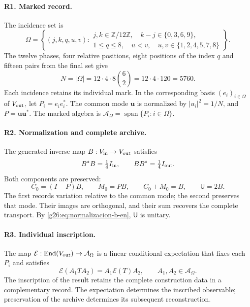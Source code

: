 \paragraph{R1. Marked record.}
The incidence set is
\begin{equation}
 \Omega=\left\{(j,k,q,u,v):
 \begin{array}{l}
 j,k\in\mathbb Z/12\mathbb Z,\quad k-j\in\{0,3,6,9\},\\
 1\leq q\leq8,\quad u<v,\quad
 u,v\in\{1,2,4,5,7,8\}
 \end{array}\right\}.
 \label{g26:eq:omega-rigidez-en}
\end{equation}
The twelve phases, four relative positions, eight positions of the
index \(q\) and fifteen pairs from the final set give
\begin{equation}
 N=|\Omega|=12\cdot4\cdot8\binom62
   =12\cdot4\cdot120=5760.
 \label{g26:eq:cardinal-rigidez-en}
\end{equation}
Each incidence retains its individual mark. In the corresponding basis
\((e_i)_{i\in\Omega}\) of \(V_{\rm out}\), let
\(P_i=e_ie_i^*\). The common mode \(\boldsymbol u\) is normalized
by \(|u_i|^2=1/N\), and \(P=\boldsymbol u\boldsymbol u^*\).
The marked algebra is
\(\mathcal A_\Omega=\operatorname{span}\{P_i:i\in\Omega\}\).

\paragraph{R2. Normalization and complete archive.}
The generated inverse map \(B:V_{\rm in}\to V_{\rm out}\) satisfies
\begin{equation}
 B^*B=\tfrac14 I_{\rm in},\qquad
 BB^*=\tfrac14 I_{\rm out}.
 \label{g26:eq:normalizacion-b-en}
\end{equation}
Both components are preserved:
\begin{equation}
 C_0=(I-P)B,\qquad M_0=PB,\qquad
 C_0+M_0=B,\qquad \mathsf U=2B.
 \label{g26:eq:archivo-completo-en}
\end{equation}
The first records variation relative to the common mode; the second
preserves that mode. Their images are orthogonal, and their sum
recovers the complete transport. By
\eqref{g26:eq:normalizacion-b-en}, \(\mathsf U\) is unitary.

\paragraph{R3. Individual inscription.}
The map
\(\mathcal E:\operatorname{End}(V_{\rm out})\to\mathcal A_\Omega\)
is a linear conditional expectation that fixes each \(P_i\) and satisfies
\begin{equation}
 \mathcal E(A_1TA_2)=A_1\mathcal E(T)A_2,
 \qquad A_1,A_2\in\mathcal A_\Omega.
 \label{g26:eq:bimodularidad-en}
\end{equation}
The inscription of the result retains the complete construction data
in a complementary record. The expectation determines the inscribed
observable; preservation of the archive determines its subsequent
reconstruction.

